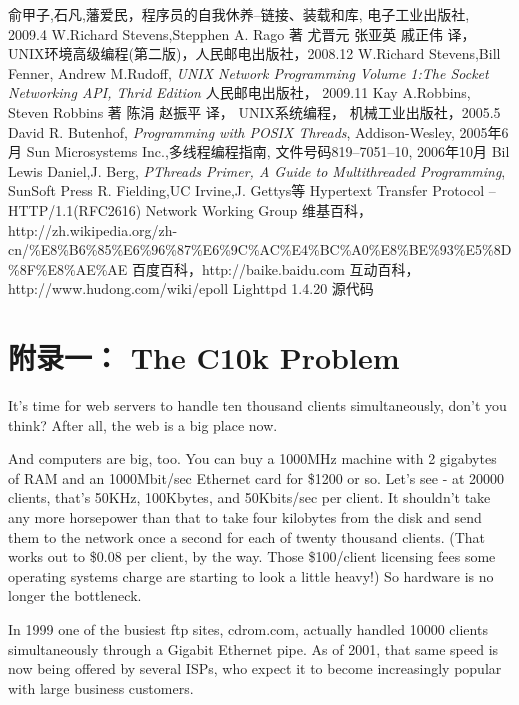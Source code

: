 \documentclass[twoside, xetex]{report}
\begin{document}
\begin{thebibliography}{99}
俞甲子,石凡,藩爱民，程序员的自我休养--链接、装载和库, 电子工业出版社, 2009.4
W.Richard Stevens,Stepphen A. Rago 著 尤晋元 张亚英 戚正伟 译， UNIX环境高级编程(第二版)，人民邮电出版社，2008.12
W.Richard Stevens,Bill Fenner, Andrew M.Rudoff, \emph{UNIX Network Programming Volume 1:The Socket Networking API, Thrid Edition} 人民邮电出版社， 2009.11
 Kay A.Robbins, Steven Robbins 著 陈涓 赵振平 译， UNIX系统编程， 机械工业出版社，2005.5
David R. Butenhof, \emph{Programming with POSIX Threads}, Addison-Wesley, 2005年6月
Sun Microsystems Inc.,多线程编程指南, 文件号码819–7051–10, 2006年10月
Bil Lewis Daniel,J. Berg, \emph{PThreads Primer, A Guide to Multithreaded Programming}, SunSoft Press
R. Fielding,UC Irvine,J. Gettys等 Hypertext Transfer Protocol -- HTTP/1.1(RFC2616) Network Working Group
维基百科，http://zh.wikipedia.org/zh-cn/\%E8\%B6\%85\%E6\%96\%87\%E6\%9C\%AC\%E4\%BC\%A0\%E8\%BE\%93\%E5\%8D\%8F\%E8\%AE\%AE
百度百科，http://baike.baidu.com
互动百科，http://www.hudong.com/wiki/epoll
Lighttpd 1.4.20 源代码
\end{thebibliography}


\chapter{附录一： The C10k Problem}

It's time for web servers to handle ten thousand clients simultaneously, don't you think? After all, the web is a big place now.

And computers are big, too. You can buy a 1000MHz machine with 2 gigabytes of RAM and an 1000Mbit/sec Ethernet card for \$1200 or so. Let's see - at 20000 clients, that's 50KHz, 100Kbytes, and 50Kbits/sec per client. It shouldn't take any more horsepower than that to take four kilobytes from the disk and send them to the network once a second for each of twenty thousand clients. (That works out to \$0.08 per client, by the way. Those \$100/client licensing fees some operating systems charge are starting to look a little heavy!) So hardware is no longer the bottleneck.

In 1999 one of the busiest ftp sites, cdrom.com, actually handled 10000 clients simultaneously through a Gigabit Ethernet pipe. As of 2001, that same speed is now being offered by several ISPs, who expect it to become increasingly popular with large business customers.
\end{document}
